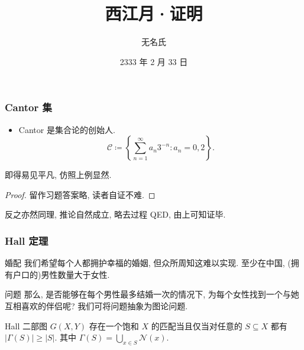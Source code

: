 \documentclass[notheorems, noamsthm, aspectratio=169, 12pt]{beamer}
\title{西江月·证明}
\author{无名氏}
\institute{加里敦大学}
\date{2333 年 2 月 33 日}
\begin{document}
    \maketitle
    \begin{frame}
        \frametitle{Cantor 集}
        \begin{itemize}
            \item Cantor 是集合论的创始人.
            \[ \mathscr C \coloneqq \left\{\sum_{n=1}^\infty a_n3^{-n}:a_n=0, 2 \right\}. \]
        \end{itemize}
        \begin{theorem}[沃·兹基硕德, 2022]
            即得易见平凡, 仿照上例显然.
        \end{theorem}
        \begin{proof}
            留作习题答案略, 读者自证不难.
        \end{proof}
        \begin{example}
            反之亦然同理, 推论自然成立, 略去过程 QED, 由上可知证毕.
        \end{example}
    \end{frame}

    \begin{frame}
        \frametitle{Hall 定理}
        \begin{block}{婚配}
            我们希望每个人都拥护幸福的婚姻, 但众所周知这难以实现. 至少在中国, (拥有户口的)男性数量大于女性.
        \end{block}
        \begin{alertblock}{问题}
            那么, 是否能够在每个男性最多结婚一次的情况下, 为每个女性找到一个与她互相喜欢的伴侣呢? 我们可将问题抽象为图论问题.
        \end{alertblock}
        \begin{exampleblock}{Hall}
            二部图 $G(X, Y)$ 存在一个饱和 $X$ 的匹配当且仅当对任意的 $S \subseteq X$ 都有 $|\Gamma(S)| \geq |S|$. 其中 $\Gamma(S) = \bigcup_{x \in S} \mathcal N(x)$.
        \end{exampleblock}
    \end{frame}
\end{document}
